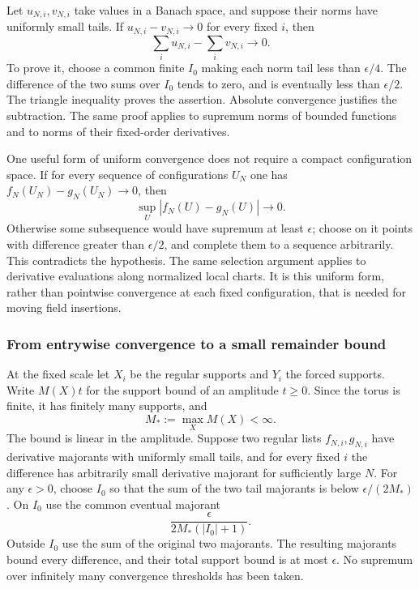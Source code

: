 Let $u_{N,i},v_{N,i}$ take values in a Banach space, and suppose
their norms have uniformly small tails. If
$u_{N,i}-v_{N,i}\to0$ for every fixed $i$, then
\begin{equation}
                 \sum_i u_{N,i}-\sum_i v_{N,i}\longrightarrow0.
\label{eq:source-tight-sum}
\end{equation}
To prove it, choose a common finite $I_0$ making each norm tail
less than $\epsilon/4$. The difference of the two sums over
$I_0$ tends to zero, and is eventually less than $\epsilon/2$.
The triangle inequality proves the assertion. Absolute convergence
justifies the subtraction. The same proof applies to supremum norms
of bounded functions and to norms of their fixed-order derivatives.

One useful form of uniform convergence does not require a compact
configuration space. If for every sequence of configurations $U_N$
one has $f_N(U_N)-g_N(U_N)\to0$, then
\[
                    \sup_U|f_N(U)-g_N(U)|\longrightarrow0.
\]
Otherwise some subsequence would have supremum at least $\epsilon$;
choose on it points with difference greater than $\epsilon/2$,
and complete them to a sequence arbitrarily. This contradicts
the hypothesis. The same selection argument applies to derivative
evaluations along normalized local charts. It is this uniform
form, rather than pointwise convergence at each fixed configuration,
that is needed for moving field insertions.

\subsubsection{From entrywise convergence to a small remainder bound}
At the fixed scale let $X_i$ be the regular supports and $Y_i$
the forced supports. Write $M(X)t$ for the support bound of an
amplitude $t\ge0$. Since the torus is finite, it has finitely many
supports, and
\[
                         M_*:=\max_X M(X)<\infty.
\]
The bound is linear in the amplitude. Suppose two regular lists
$f_{N,i},g_{N,i}$ have derivative majorants with uniformly small
tails, and for every fixed $i$ the difference has arbitrarily
small derivative majorant for sufficiently large $N$.
For any $\epsilon>0$, choose $I_0$ so that the sum of the two
tail majorants is below $\epsilon/(2M_*)$. On $I_0$ use the
common eventual majorant
\[
                     \frac{\epsilon}{2M_*(|I_0|+1)}.
\]
Outside $I_0$ use the sum of the original two majorants.
The resulting majorants bound every difference, and their total
support bound is at most $\epsilon$. No supremum over infinitely
many convergence thresholds has been taken.

